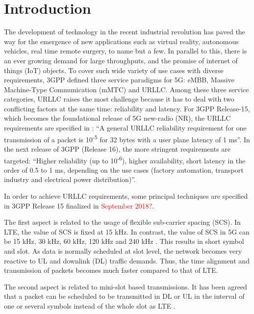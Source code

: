 \documentclass{ieeeaccess}
\begin{document}
\titlepgskip=-15pt

\maketitle

\section{Introduction}
\label{I}
The development of technology in the recent industrial revolution has paved the way for the emergence of new applications such as virtual reality, autonomous vehicles, real time remote surgery, to name but a few. In parallel to this, there is an ever growing demand for large throughputs, and the promise of internet of things (IoT) objects. To cover such wide variety of use cases with diverse requirements, 3GPP defined three service paradigms for 5G: eMBB, Massive Machine-Type Communication (mMTC) and URLLC. Among these three service categories, URLLC raises the most challenge because it has to deal with two conflicting factors at the same time: reliability and latency. For 3GPP Release-15, which becomes the foundational release of 5G new-radio (NR), the URLLC requirements are specified in \cite{ref1}: ``A general URLLC reliability requirement for one transmission of a packet is 10\textsuperscript{-5} for 32 bytes with a user plane latency of 1 ms''. In the next release of 3GPP (Release 16), the more stringent requirements are targeted: ``Higher reliability (up to 10\textsuperscript{-6}), higher availability, short latency in the order of 0.5 to 1 ms, depending on the use cases (factory automation, transport industry and electrical power distribution)''\cite{ref2}.

In order to achieve URLLC requirements, some principal techniques are specified in 3GPP Release 15 finalized in \textcolor{red}{September 2018?}.

The first aspect is related to the usage of flexible sub-carrier spacing (SCS). In LTE, the value of SCS is fixed at 15 kHz. In contrast, the value of SCS in 5G can be 15 kHz, 30 kHz, 60 kHz, 120 kHz and 240 kHz \cite{ref3}. This results in short symbol and slot. As data is normally scheduled at slot level, the network becomes very reactive to UL and downlink (DL) traffic demands. Thus, the time alignment and transmission of packets becomes much faster compared to that of LTE. 

The second aspect is related to mini-slot based transmissions. It has been agreed that a packet can be scheduled to be transmitted in DL or UL in the interval of one or several symbols instead of the whole slot as LTE \cite{ref4}.
\end{document}
